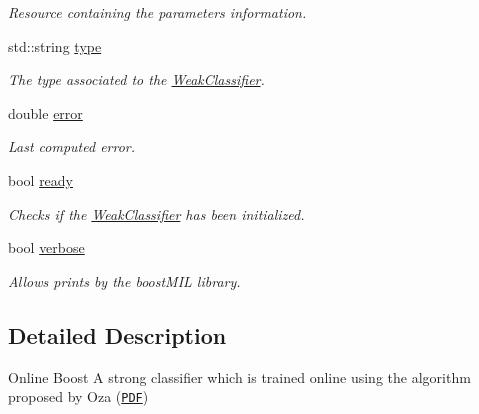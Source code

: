 \begin{DoxyCompactItemize}
\begin{DoxyCompactList}\small\item\em Resource containing the parameters information. \end{DoxyCompactList}\item 
std\+::string \hyperlink{classiCub_1_1boostMIL_1_1WeakClassifier_a6e08c26ea2e12086317d6cdd0f65bbd9}{type}\label{classiCub_1_1boostMIL_1_1WeakClassifier_a6e08c26ea2e12086317d6cdd0f65bbd9}

\begin{DoxyCompactList}\small\item\em The type associated to the \hyperlink{classiCub_1_1boostMIL_1_1WeakClassifier}{Weak\+Classifier}. \end{DoxyCompactList}\item 
double \hyperlink{classiCub_1_1boostMIL_1_1WeakClassifier_afa9e7bb9b9a92d349b40a4f127386a59}{error}\label{classiCub_1_1boostMIL_1_1WeakClassifier_afa9e7bb9b9a92d349b40a4f127386a59}

\begin{DoxyCompactList}\small\item\em Last computed error. \end{DoxyCompactList}\item 
bool \hyperlink{classiCub_1_1boostMIL_1_1WeakClassifier_a7fe5fe3366a82def4031c16a9a278350}{ready}\label{classiCub_1_1boostMIL_1_1WeakClassifier_a7fe5fe3366a82def4031c16a9a278350}

\begin{DoxyCompactList}\small\item\em Checks if the \hyperlink{classiCub_1_1boostMIL_1_1WeakClassifier}{Weak\+Classifier} has been initialized. \end{DoxyCompactList}\item 
bool \hyperlink{classiCub_1_1boostMIL_1_1WeakClassifier_a63a5602437f6936da17e33ca4d89976a}{verbose}\label{classiCub_1_1boostMIL_1_1WeakClassifier_a63a5602437f6936da17e33ca4d89976a}

\begin{DoxyCompactList}\small\item\em Allows prints by the boost\+M\+I\+L library. \end{DoxyCompactList}\end{DoxyCompactItemize}


\subsection{Detailed Description}
Online Boost A strong classifier which is trained online using the algorithm proposed by Oza (\href{http://ti.arc.nasa.gov/m/profile/oza/b2hd-oza05.html}{\tt P\+D\+F}) 

